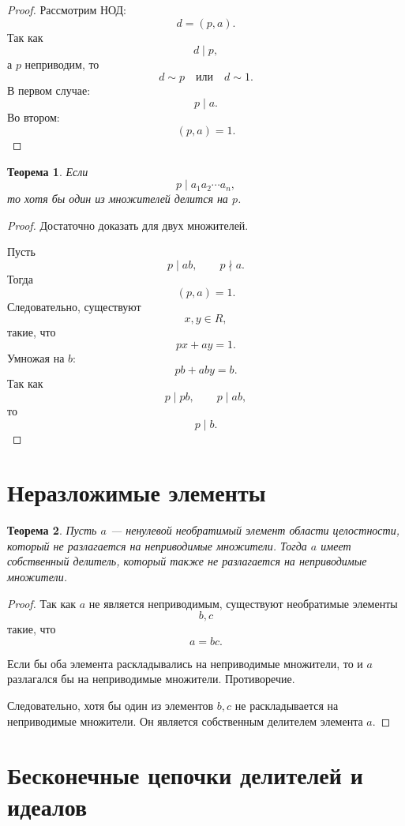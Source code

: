\documentclass[12pt, a4paper]{article}
\newtheorem{theorem}{Теорема}
\theoremstyle{definition}
\theoremstyle{remark}
\begin{document}
\begin{proof}
	Рассмотрим НОД:
	\[
	d=(p,a).
	\]
	Так как
	\[
	d\mid p,
	\]
	а $p$ неприводим, то
	\[
	d\sim p
	\quad \text{или}\quad
	d\sim 1.
	\]
	В первом случае:
	\[
	p\mid a.
	\]
	Во втором:
	\[
	(p,a)=1.
	\]
\end{proof}

\begin{theorem}
	Если
	\[
	p\mid a_1a_2\cdots a_n,
	\]
	то хотя бы один из множителей делится на $p$.
\end{theorem}

\begin{proof}
	Достаточно доказать для двух множителей.
	
	Пусть
	\[
	p\mid ab,
	\qquad
	p\nmid a.
	\]
	Тогда
	\[
	(p,a)=1.
	\]
	Следовательно, существуют
	\[
	x,y\in R,
	\]
	такие, что
	\[
	px+ay=1.
	\]
	Умножая на $b$:
	\[
	pb+aby=b.
	\]
	Так как
	\[
	p\mid pb,
	\qquad
	p\mid ab,
	\]
	то
	\[
	p\mid b.
	\]
\end{proof}

\section{Неразложимые элементы}

\begin{theorem}
	Пусть $a$ --- ненулевой необратимый элемент области целостности, который не
	разлагается на неприводимые множители. Тогда $a$ имеет собственный делитель,
	который также не разлагается на неприводимые множители.
\end{theorem}

\begin{proof}
	Так как $a$ не является неприводимым, существуют необратимые элементы
	\[
	b,c
	\]
	такие, что
	\[
	a=bc.
	\]
	
	Если бы оба элемента раскладывались на неприводимые множители, то и $a$
	разлагался бы на неприводимые множители. Противоречие.
	
	Следовательно, хотя бы один из элементов $b,c$ не раскладывается на
	неприводимые множители. Он является собственным делителем элемента $a$.
\end{proof}

\section{Бесконечные цепочки делителей и идеалов}
\end{document}
